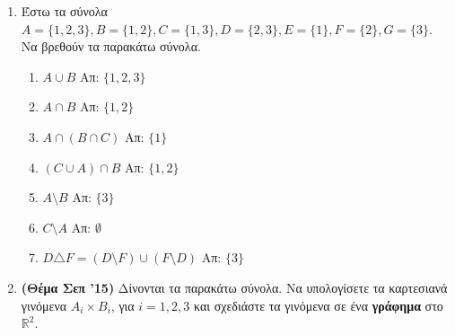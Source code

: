 



\pagestyle{vangelis}



\begin{center}
  \minibox{\large\bfseries \textcolor{Col1}{Ασκήσεις στα Σύνολα}}
\end{center}

\vspace{\baselineskip}

\begin{enumerate}

  \item Έστω τα σύνολα $A=\{1,2,3\}, B=\{1,2\}, C=\{1,3\}, D=\{2,3\}, E=\{1\}, 
    F=\{2\}, G=\{3\}$. Να βρεθούν τα παρακάτω σύνολα.
    \begin{enumerate}[label=(\roman*)]
      \item $A\cup B$ \hfill Απ: $ \{ 1,2,3 \} $ 
      \item $A\cap B$ \hfill Απ: $ \{ 1,2 \} $ 
      \item $A\cap (B\cap C)$ \hfill Απ: $ \{ 1 \} $ 
      \item $(C\cup A)\cap B$ \hfill Απ: $ \{ 1,2 \} $ 
      \item $A\setminus B$ \hfill Απ: $ \{ 3 \} $ 
      \item $C\setminus A$ \hfill Απ: $ \emptyset $  
      \item $D\triangle F = (D\setminus F)\cup(F\setminus D)$ \hfill Απ: $ \{ 3 \} $ 
    \end{enumerate}

  \item {\bfseries(Θέμα Σεπ '15)} Δίνονται τα παρακάτω σύνολα. Να υπολογίσετε 
    τα καρτεσιανά γινόμενα $A_i\times B_i$, για $i=1,2,3$ και σχεδιάστε τα γινόμενα 
    σε ένα \textbf{γράφημα} στο $\mathbb{R}^2$.


\end{enumerate}
